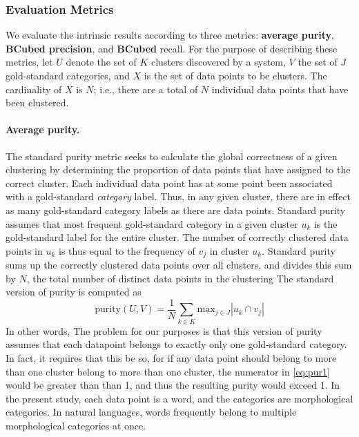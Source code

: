 \subsubsection{Evaluation Metrics} 
\label{sec:metrics}
We evaluate the intrinsic results according to three metrics: \textbf{average purity}, \textbf{BCubed precision}, and
 \textbf{BCubed} recall. For the purpose of describing these metrics,
 let $U$ denote the set of $K$ clusters discovered by a system, 
 $V$ the set of $J$ gold-standard categories, and $X$ is the set of data points 
 to be clusters. The cardinality of $X$ is $N$; i.e., there are a total of $N$ 
 individual data points that have been clustered.
\paragraph{Average purity.}
The standard purity metric seeks to calculate the global correctness of a 
given clustering by determining the proportion of data points that have 
assigned to the correct cluster. Each individual data point has at some 
point been associated with a gold-standard \emph{category} label. Thus, 
in any given cluster, there are in effect as many gold-standard category 
labels as there are data points. Standard purity assumes that most frequent 
 gold-standard category in a given cluster $u_k$ is the gold-standard label for the entire cluster. The number of correctly clustered data points in $u_k$ is thus equal to the frequency of  $v_j$ in cluster $u_k$. Standard purity sums up the correctly clustered data points over all clusters, and divides this sum by $N$, the total number of distinct data points in the clustering
 The standard version of purity is computed as 
\begin{equation} \label{eq:pur1}
\text{purity}(U, V) = \frac{1}{N} \sum_{k \in K} \text{max}_{j \in J} |u_k \cap v_j|
\end{equation}
In other words, 
The problem for our purposes is that this version of purity assumes that each datapoint belongs to exactly only one gold-standard category. In fact, it requires that this be so, for if any data point should belong to more than one cluster belong to more than one cluster, the numerator in \eqref{eq:pur1} would be greater than than 1, and thus the resulting purity would exceed 1.
In the present study, each data point is a word, and the categories are morphological categories. In natural languages, words frequently belong to multiple morphological categories at once.

